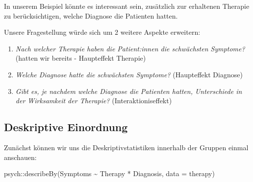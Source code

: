 \documentclass[
]{book}
\newenvironment{Shaded}{\begin{snugshade}}{\end{snugshade}}
\newcommand{\AttributeTok}[1]{\textcolor[rgb]{0.77,0.63,0.00}{#1}}
\newcommand{\FunctionTok}[1]{\textcolor[rgb]{0.00,0.00,0.00}{#1}}
\newcommand{\NormalTok}[1]{#1}
\newcommand{\SpecialCharTok}[1]{\textcolor[rgb]{0.00,0.00,0.00}{#1}}
\providecommand{\tightlist}{%
  \setlength{\itemsep}{0pt}\setlength{\parskip}{0pt}}
\begin{document}
In unserem Beispiel könnte es interessant sein, zusätzlich zur erhaltenen Therapie zu berücksichtigen, welche Diagnose die Patienten hatten.

Unsere Fragestellung würde sich um 2 weitere Aspekte erweitern:

\begin{enumerate}
\def\labelenumi{\arabic{enumi}.}
\tightlist
\item
  \emph{Nach welcher Therapie haben die Patient:innen die schwächsten Symptome?} (hatten wir bereits - Haupteffekt Therapie)
\item
  \emph{Welche Diagnose hatte die schwächsten Symptome?} (Haupteffekt Diagnose)
\item
  \emph{Gibt es, je nachdem welche Diagnose die Patienten hatten, Unterschiede in der Wirksamkeit der Therapie?} (Interaktioniseffekt)
\end{enumerate}

\hypertarget{deskriptive-einordnung-5}{%
\subsection{Deskriptive Einordnung}\label{deskriptive-einordnung-5}}

Zunächst können wir uns die Deskriptivstatistiken innerhalb der Gruppen einmal anschauen:

\begin{Shaded}
\begin{Highlighting}[]
\NormalTok{psych}\SpecialCharTok{::}\FunctionTok{describeBy}\NormalTok{(Symptoms }\SpecialCharTok{\textasciitilde{}}\NormalTok{ Therapy }\SpecialCharTok{*}\NormalTok{ Diagnosis, }\AttributeTok{data =}\NormalTok{ therapy)}
\end{Highlighting}
\end{Shaded}
\end{document}
